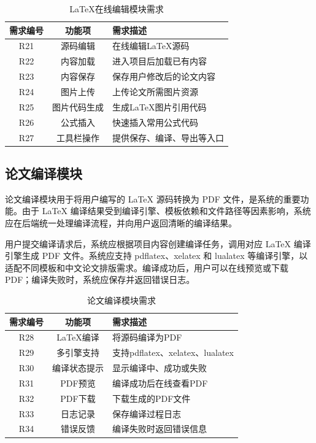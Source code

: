 \documentclass{xduugthesis}
\begin{document}
\begin{table}[!ht]
    \centering
    \caption{LaTeX在线编辑模块需求}
    \label{tab:latex-editor-requirement}
    \begin{tabular}{|c|c|p{7cm}|}
        \hline
        需求编号 & 功能项 & 需求描述 \\
        \hline
        R21 & 源码编辑 & 在线编辑LaTeX源码 \\
        \hline
        R22 & 内容加载 & 进入项目后加载已有内容 \\
        \hline
        R23 & 内容保存 & 保存用户修改后的论文内容 \\
        \hline
        R24 & 图片上传 & 上传论文所需图片资源 \\
        \hline
        R25 & 图片代码生成 & 生成LaTeX图片引用代码 \\
        \hline
        R26 & 公式插入 & 快速插入常用公式代码 \\
        \hline
        R27 & 工具栏操作 & 提供保存、编译、导出等入口 \\
        \hline
    \end{tabular}
\end{table}

\subsection{论文编译模块}
论文编译模块用于将用户编写的 LaTeX 源码转换为 PDF 文件，是系统的重要功能。由于 LaTeX 编译结果受到编译引擎、模板依赖和文件路径等因素影响，系统应在后端统一处理编译流程，并向用户返回清晰的编译结果。

用户提交编译请求后，系统应根据项目内容创建编译任务，调用对应 LaTeX 编译引擎生成 PDF 文件。系统应支持 pdflatex、xelatex 和 lualatex 等编译引擎，以适配不同模板和中文论文排版需求。编译成功后，用户可以在线预览或下载 PDF；编译失败时，系统应保存并返回错误日志。

\begin{table}[!ht]
    \centering
    \caption{论文编译模块需求}
    \label{tab:compile-requirement}
    \begin{tabular}{|c|c|p{7cm}|}
        \hline
        需求编号 & 功能项 & 需求描述 \\
        \hline
        R28 & LaTeX编译 & 将源码编译为PDF \\
        \hline
        R29 & 多引擎支持 & 支持pdflatex、xelatex、lualatex \\
        \hline
        R30 & 编译状态提示 & 显示编译中、成功或失败 \\
        \hline
        R31 & PDF预览 & 编译成功后在线查看PDF \\
        \hline
        R32 & PDF下载 & 下载生成的PDF文件 \\
        \hline
        R33 & 日志记录 & 保存编译过程日志 \\
        \hline
        R34 & 错误反馈 & 编译失败时返回错误信息 \\
        \hline
    \end{tabular}
\end{table}
\end{document}

